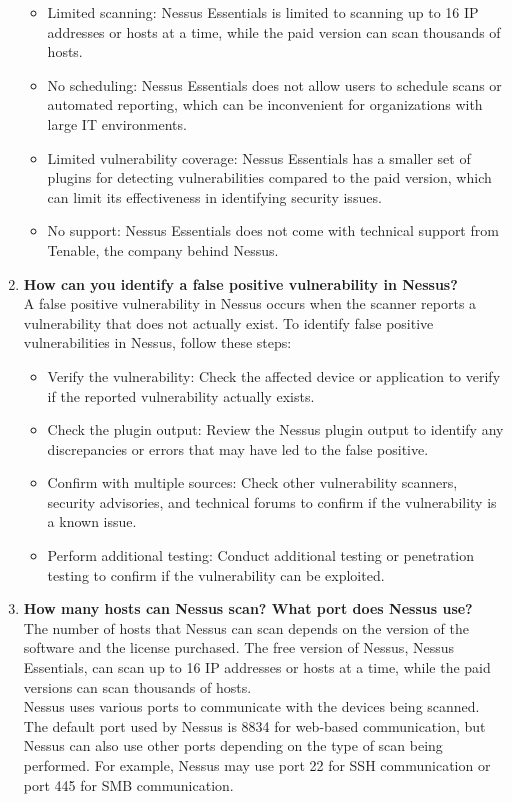 \documentclass[openany]{book}
\begin{document}
\begin{enumerate}
          \begin{itemize}
              \item Limited scanning: Nessus Essentials is limited to scanning up to 16 IP addresses or hosts at a time, while the paid version can scan thousands of hosts.
              \item No scheduling: Nessus Essentials does not allow users to schedule scans or automated reporting, which can be inconvenient for organizations with large IT environments.
              \item Limited vulnerability coverage: Nessus Essentials has a smaller set of plugins for detecting vulnerabilities compared to the paid version, which can limit its effectiveness in identifying security issues.
              \item No support: Nessus Essentials does not come with technical support from Tenable, the company behind Nessus.
          \end{itemize}
    \item \textbf{How can you identify a false positive vulnerability in Nessus?}\\

          A false positive vulnerability in Nessus occurs when the scanner reports a vulnerability that does not actually exist. To identify false positive vulnerabilities in Nessus, follow these steps:

          \begin{itemize}
              \item Verify the vulnerability: Check the affected device or application to verify if the reported vulnerability actually exists.
              \item Check the plugin output: Review the Nessus plugin output to identify any discrepancies or errors that may have led to the false positive.
              \item Confirm with multiple sources: Check other vulnerability scanners, security advisories, and technical forums to confirm if the vulnerability is a known issue.
              \item Perform additional testing: Conduct additional testing or penetration testing to confirm if the vulnerability can be exploited.
          \end{itemize}

    \item \textbf{How many hosts can Nessus scan? What port does Nessus use?}\\

          The number of hosts that Nessus can scan depends on the version of the software and the license purchased. The free version of Nessus, Nessus Essentials, can scan up to 16 IP addresses or hosts at a time, while the paid versions can scan thousands of hosts.\\

          Nessus uses various ports to communicate with the devices being scanned. The default port used by Nessus is 8834 for web-based communication, but Nessus can also use other ports depending on the type of scan being performed. For example, Nessus may use port 22 for SSH communication or port 445 for SMB communication.
\end{enumerate}
\end{document}
